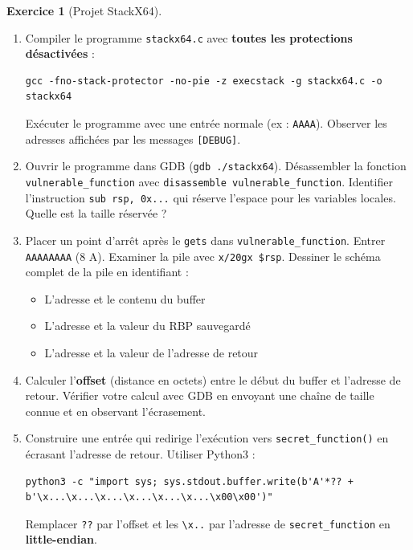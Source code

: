 \documentclass[a4paper,11pt]{article}
\theoremstyle{plain}
\theoremstyle{definition}
\newtheorem{exercice}{Exercice}
\begin{document}
\begin{exercice}[Projet StackX64]
\begin{enumerate}
\item[\textbf{1a)}] Compiler le programme \texttt{stackx64.c} avec \textbf{toutes les protections désactivées} :
\begin{lstlisting}[style=GDBStyle]
gcc -fno-stack-protector -no-pie -z execstack -g stackx64.c -o stackx64
\end{lstlisting}
Exécuter le programme avec une entrée normale (ex : \texttt{AAAA}). Observer les adresses affichées par les messages \texttt{[DEBUG]}.

\item[\textbf{1b)}] Ouvrir le programme dans GDB (\texttt{gdb ./stackx64}). Désassembler la fonction \texttt{vulnerable\_function} avec \texttt{disassemble vulnerable\_function}. Identifier l'instruction \texttt{sub rsp, 0x...} qui réserve l'espace pour les variables locales. Quelle est la taille réservée ?

\item[\textbf{1c)}] Placer un point d'arrêt après le \texttt{gets} dans \texttt{vulnerable\_function}. Entrer \texttt{AAAAAAAA} (8 A). Examiner la pile avec \texttt{x/20gx \$rsp}. Dessiner le schéma complet de la pile en identifiant :
\begin{itemize}
    \item L'adresse et le contenu du buffer
    \item L'adresse et la valeur du RBP sauvegardé
    \item L'adresse et la valeur de l'adresse de retour
\end{itemize}

\item[\textbf{1d)}] Calculer l'\textbf{offset} (distance en octets) entre le début du buffer et l'adresse de retour. Vérifier votre calcul avec GDB en envoyant une chaîne de taille connue et en observant l'écrasement.

\item[\textbf{1e)}] Construire une entrée qui redirige l'exécution vers \texttt{secret\_function()} en écrasant l'adresse de retour. Utiliser Python3 :
\begin{lstlisting}[style=GDBStyle]
python3 -c "import sys; sys.stdout.buffer.write(b'A'*?? + b'\x...\x...\x...\x...\x...\x...\x00\x00')"
\end{lstlisting}
Remplacer \texttt{??} par l'offset et les \texttt{\textbackslash x..} par l'adresse de \texttt{secret\_function} en \textbf{little-endian}.
\end{enumerate}


\end{exercice}
\end{document}
